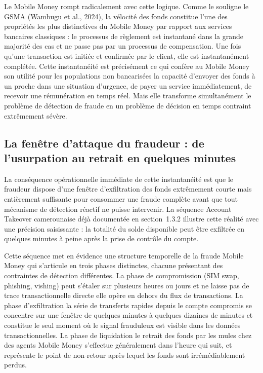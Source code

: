 \documentclass[11pt,a4paper,oneside]{report}
\theoremstyle{definition}
\theoremstyle{remark}
\begin{document}
Le Mobile Money rompt radicalement avec cette logique. Comme le souligne le GSMA (Wambugu et al., 2024), la vélocité des fonds constitue l'une des propriétés les plus distinctives du Mobile Money par rapport aux services bancaires classiques : le processus de règlement est instantané dans la grande majorité des cas et ne passe pas par un processus de compensation. Une fois qu'une transaction est initiée et confirmée par le client, elle est instantanément complétée. Cette instantanéité est précisément ce qui confère au Mobile Money son utilité pour les populations non bancarisées  la capacité d'envoyer des fonds à un proche dans une situation d'urgence, de payer un service immédiatement, de recevoir une rémunération en temps réel. Mais elle transforme simultanément le problème de détection de fraude en un problème de décision en temps contraint extrêmement sévère.

\subsection{La fenêtre d'attaque du fraudeur : de l'usurpation au retrait en quelques minutes}

La conséquence opérationnelle immédiate de cette instantanéité est que le fraudeur dispose d'une fenêtre d'exfiltration des fonds extrêmement courte mais entièrement suffisante pour consommer une fraude complète avant que tout mécanisme de détection réactif ne puisse intervenir. La séquence Account Takeover camerounaise déjà documentée en section~1.3.2 illustre cette réalité avec une précision saisissante : la totalité du solde disponible peut être exfiltrée en quelques minutes à peine après la prise de contrôle du compte.

Cette séquence met en évidence une structure temporelle de la fraude Mobile Money qui s'articule en trois phases distinctes, chacune présentant des contraintes de détection différentes. La phase de compromission (SIM swap, phishing, vishing) peut s'étaler sur plusieurs heures ou jours et ne laisse pas de trace transactionnelle directe  elle opère en dehors du flux de transactions. La phase d'exfiltration  la série de transferts rapides depuis le compte compromis  se concentre sur une fenêtre de quelques minutes à quelques dizaines de minutes et constitue le seul moment où le signal frauduleux est visible dans les données transactionnelles. La phase de liquidation  le retrait des fonds par les mules chez des agents Mobile Money  s'effectue généralement dans l'heure qui suit, et représente le point de non-retour après lequel les fonds sont irrémédiablement perdus.
\end{document}
